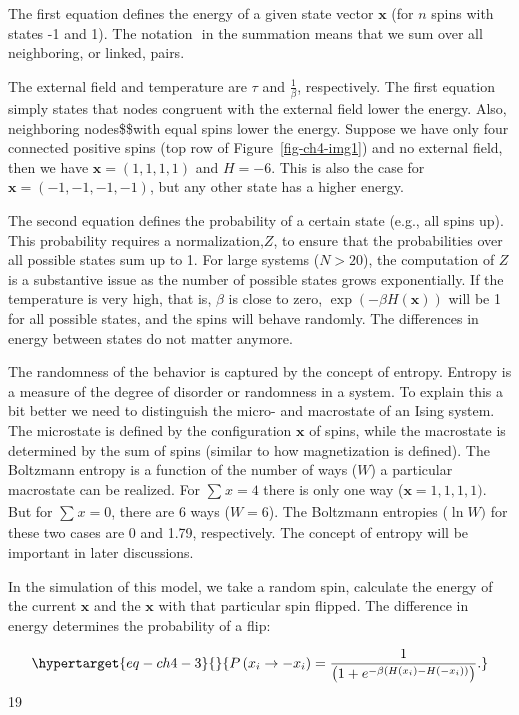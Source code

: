 \documentclass[
  letterpaper,
]{scrbook}
\begin{document}
The first equation defines the energy of a given state vector
\(\mathbf{x}\) (for \(n\) spins with states -1 and 1). The notation
\(< i,j >\) in the summation means that we sum over all neighboring, or
linked, pairs.

The external field and temperature are \(\tau\) and \(\frac{1}{\beta}\),
respectively. The first equation simply states that nodes congruent with
the external field lower the energy. Also, neighboring nodes\$\$with
equal spins lower the energy. Suppose we have only four connected
positive spins (top row of Figure~\ref{fig-ch4-img1}) and no external
field, then we have \(\mathbf{x} = (1,1,1,1)\) and \(H = - 6\). This is
also the case for \(\mathbf{x} = ( - 1, - 1, - 1, - 1)\), but any other
state has a higher energy.

The second equation defines the probability of a certain state (e.g.,
all spins up). This probability requires a normalization,\(Z\), to
ensure that the probabilities over all possible states sum up to 1. For
large systems (\(N > 20\)), the computation of \(Z\) is a substantive
issue as the number of possible states grows exponentially. If the
temperature is very high, that is, \(\beta\) is close to zero,
\(\exp\left( - \beta H\left( \mathbf{x} \right) \right)\) will be 1 for
all possible states, and the spins will behave randomly. The differences
in energy between states do not matter anymore.

The randomness of the behavior is captured by the concept of entropy.
Entropy is a measure of the degree of disorder or randomness in a
system. To explain this a bit better we need to distinguish the micro-
and macrostate of an Ising system. The microstate is defined by the
configuration \(\mathbf{x}\) of spins, while the macrostate is
determined by the sum of spins (similar to how magnetization is
defined). The Boltzmann entropy is a function of the number of ways
(\(W\)) a particular macrostate can be realized. For \(\sum_{}^{}x = 4\)
there is only one way (\(\mathbf{x} = 1,1,1,1)\). But for
\(\sum_{}^{}x = 0\), there are 6 ways (\(W = 6\)). The Boltzmann
entropies (\(\ln W)\) for these two cases are 0 and 1.79, respectively.
The concept of entropy will be important in later discussions.

In the simulation of this model, we take a random spin, calculate the
energy of the current \(\mathbf{x}\) and the \(\mathbf{x}\) with that
particular spin flipped. The difference in energy determines the
probability of a flip:

\begin{equation}\protect\hypertarget{eq-ch4-3}{}{
P\left( x_{i} \rightarrow - x_{i} \right) = \frac{1}{\left( 1 + e^{- \beta\left( H\left( x_{i} \right) - H\left( - x_{i} \right) \right)} \right)}.}\label{eq-ch4-3}\end{equation}
19
\end{document}
